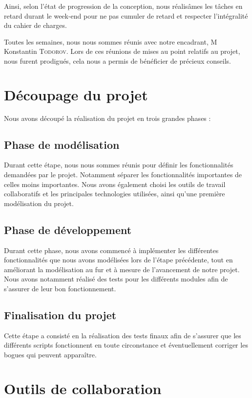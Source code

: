 \documentclass[oneside,13pt,a4paper]{report}
\begin{document}
Ainsi, selon l'état de progression de la conception, nous réalisâmes les tâches en retard durant le week-end pour ne pas cumuler de retard et respecter l'intégralité du cahier de charges.

Toutes les semaines, nous nous sommes réunis avec notre encadrant, M Konstantin \textsc{Todorov}. Lors de ces réunions de mises au point relatifs au projet, nous furent prodigués, cela nous a permis de bénéficier de précieux conseils.

\section{Découpage du projet}

Nous avons découpé la réalisation du projet en trois grandes phases :

\subsection{Phase de modélisation}

Durant cette étape, nous nous sommes réunis pour définir les fonctionnalités demandées par le projet. Notamment séparer les fonctionnalités importantes de celles moins importantes. Nous avons également choisi les outils de travail collaboratifs et les principales technologies utilisées, ainsi qu’une première modélisation du projet.

\subsection{Phase de développement}

Durant cette phase, nous avons commencé à implémenter les différentes fonctionnalités que nous avons modélisées lors de l'étape précédente, tout en améliorant la modélisation au fur et à mesure de l'avancement de notre projet. Nous avons notamment réalisé des tests pour les différents modules afin de s'assurer de leur bon fonctionnement.

\subsection{Finalisation du projet}

Cette étape a consisté en la réalisation des tests finaux afin de s'assurer que les différents scripts fonctionnent en toute circonstance et éventuellement corriger les bogues qui peuvent apparaître.

\section{Outils de collaboration}
\end{document}
